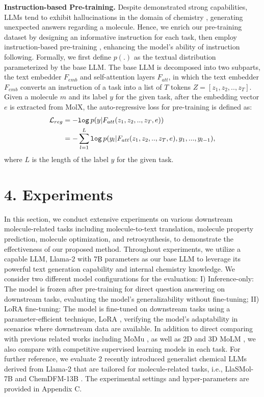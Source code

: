 \noindent
\textbf{Instruction-based Pre-training.} Despite demonstrated strong capabilities, LLMs tend to exhibit hallucinations in the domain of chemistry \cite{guo2023can}, generating unexpected answers regarding a molecule. Hence, we enrich our pre-training dataset by designing an informative instruction for each task, then employ instruction-based pre-training \cite{victor2022multitask, ouyang2022training}, enhancing the model’s ability of instruction following. Formally, we first define $p(.)$ as the textual distribution parameterized by the base LLM. The base LLM is decomposed into two subparts, the text embedder $F_{emb}$ and self-attention layers $F_{att}$, in which the text embedder $F_{emb}$ converts an instruction of a task into a list of $T$ tokens $Z = [z_1, z_2, .., z_T]$. Given a molecule $m$ and its label $y$ for the given task, after the embedding vector $e$ is extracted from MolX, the auto-regressive loss for pre-training is defined as: 
\begin{equation}
\begin{aligned}
\mathcal{L}_{reg} &= -\texttt{log} \hspace{0.2em} p(y|F_{att}(z_1, z_2, .., z_T, e)) \\
&= -\sum_{l=1}^{L} \texttt{log} \hspace{0.2em} p(y_l|F_{att}(z_1, z_2, .., z_T, e), y_1, ..., y_{l-1}), 
\end{aligned}
\end{equation}
where $L$ is the length of the label $y$ for the given task. 

\section{4. Experiments}
In this section, we conduct extensive experiments on various downstream molecule-related tasks including molecule-to-text translation, molecule property prediction, molecule optimization, and retrosynthesis, to demonstrate the effectiveness of our proposed method. Throughout experiments, we utilize a capable LLM, Llama-2 \cite{touvron2023llama} with 7B parameters as our base LLM to leverage its powerful text generation capability and internal chemistry knowledge. We consider two different model configurations for the evaluation: I) Inference-only: The model is frozen after pre-training for direct question answering on downstream tasks, evaluating the model’s generalizability without fine-tuning; II) LoRA fine-tuning: The model is fine-tuned on downstream tasks using a parameter-efficient technique, LoRA \cite{hu2021lora}, verifying the model’s adaptability in scenarios where downstream data are available. In addition to direct comparing with previous related works including MoMu \cite{su2022molecular}, as well as 2D and 3D MoLM \cite{li2023towards}, we also compare with competitive supervised learning models in each task. For further reference, we evaluate 2 recently introduced generalist chemical LLMs derived from Llama-2 \cite{touvron2023llama} that are tailored for molecule-related tasks, i.e., LlaSMol-7B \cite{yu2024llasmol} and ChemDFM-13B \cite{zhao2024chemdfm}. The experimental settings and hyper-parameters are provided in Appendix C. 

